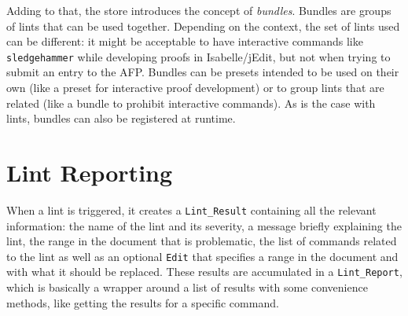 Adding to that, the store introduces the concept of \textit{bundles}.
Bundles are groups of lints that can be used together. Depending on
the context, the set of lints used can be different: it might be acceptable
to have interactive commands like \texttt{sledgehammer} while
developing proofs in Isabelle/jEdit, but not when trying to submit an entry
to the AFP. Bundles can be presets intended to be used
on their own (like a preset for interactive proof development) or
to group lints that are related (like a bundle to prohibit
interactive commands). As is the case with lints, bundles can also be
registered at runtime.

\section{Lint Reporting}\label{section:reporting}

When a lint is triggered, it creates a \texttt{Lint\_Result} 
containing all the relevant information: the name of the lint and its
severity, a message briefly explaining the lint, the range in the
document that is problematic, the list of commands related to the
lint as well as an optional \texttt{Edit} that specifies a range in the
document and with what it should be replaced. These results are accumulated in a 
\texttt{Lint\_Report}, which is basically a wrapper around a list 
of results with some convenience
methods, like getting the results for a specific command.

